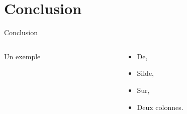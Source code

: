 \section*{Conclusion}
\begin{frame}{Conclusion}
  
\beamerdefaultoverlayspecification{} %

  \begin{columns}[]
    \begin{column}{.48\textwidth}
      Un exemple
    \end{column}
    
    \hfill{}
    
    \begin{column}{.48\textwidth}
	\begin{itemize}
	  \item De,
	  \item Silde,
	  \item Sur,
	  \item Deux colonnes.
	\end{itemize}
    \end{column}
  \end{columns}

\end{frame}
